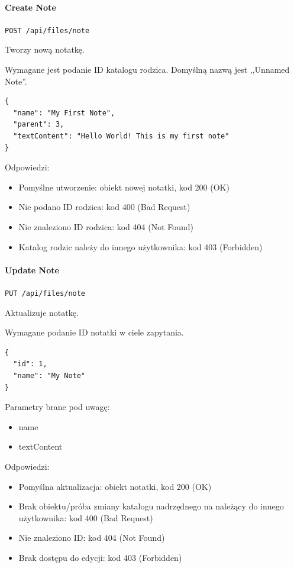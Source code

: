 \documentclass[a4paper,twoside,12pt]{book}
\begin{document}
\paragraph{Create Note}

\texttt{POST /api/files/note}

Tworzy nową notatkę.

Wymagane jest podanie ID katalogu rodzica. Domyślną nazwą jest ,,Unnamed Note''.

\begin{verbatim}
{
  "name": "My First Note",
  "parent": 3,
  "textContent": "Hello World! This is my first note"
}
\end{verbatim}

Odpowiedzi: 
\begin{itemize}
	\item Pomyślne utworzenie: obiekt nowej notatki, kod 200 (OK) 
	\item Nie podano ID rodzica: kod 400 (Bad Request)
	\item Nie znaleziono ID rodzica: kod 404 (Not Found) 
	\item Katalog rodzic należy do innego użytkownika: kod 403 (Forbidden)
\end{itemize}

\paragraph{Update Note}

\texttt{PUT /api/files/note}

Aktualizuje notatkę.

Wymagane podanie ID notatki w ciele zapytania.

\begin{verbatim}
{
  "id": 1,
  "name": "My Note"
}
\end{verbatim}

Parametry brane pod uwagę: 
\begin{itemize}
	\item  name \item  textContent
\end{itemize}

Odpowiedzi: 
\begin{itemize}
	\item Pomyślna aktualizacja: obiekt notatki, kod 200 (OK) 
	\item Brak obiektu/próba zmiany katalogu nadrzędnego na należący do innego użytkownika: kod 400 (Bad Request) 
	\item Nie znaleziono ID: kod 404 (Not Found)
	\item Brak dostępu do edycji: kod 403 (Forbidden)
\end{itemize}
\end{document}
